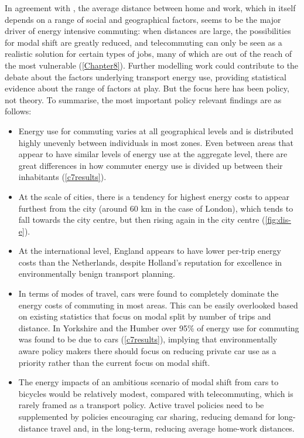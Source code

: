 In agreement with \citet{Boussauw2010}, the average distance between home and work,
which in itself depends on a range of social and geographical factors,
seems to be the major driver of energy intensive commuting: when distances
are large, the possibilities for modal shift are greatly reduced, and
telecommuting can only be seen as a realistic solution for certain types of
jobs, many of which are out of the reach of the most vulnerable
(\cref{Chapter8}).
Further modelling work could contribute to the debate about the factors
underlying transport energy use, providing statistical evidence about the range
of factors at play. But the focus here has been policy, not theory.
To summarise, the most important policy relevant findings are as follows:
\begin{itemize}
 \item Energy use for commuting varies at all geographical levels
 and is distributed highly unevenly between individuals in most zones.
 Even between areas
 that appear to have similar levels of energy use at the aggregate level, there
 are great differences in how commuter energy use is divided up between their
 inhabitants (\cref{c7results}).
 \item At the scale of cities,
 there is a tendency for highest energy costs to appear furthest from the city (around
 60 km in the case of London), which tends to fall towards the city centre, but then
 rising again in the city centre (\cref{fig:dis-e}).
 \item At the international level, England appears to have lower per-trip energy
 costs than the Netherlands, despite Holland's reputation for excellence in
 environmentally benign transport planning.
 \item In terms of modes of travel, cars were found to completely dominate the
energy costs of commuting in most areas. This can be easily overlooked based on
existing statistics that focus on modal split by number of trips and distance.
In Yorkshire and the Humber over 95\% of energy use for commuting was found to
be due to cars (\cref{c7results}), implying that environmentally aware policy
makers there should focus on reducing private car use as a priority rather than
the current focus on modal shift. 
 \item The energy impacts of an ambitious scenario of modal shift from cars to
 bicycles would be relatively modest, compared with telecommuting, which is
 rarely framed as a transport policy. Active travel policies need to be supplemented
 by policies encouraging car sharing, reducing demand for long-distance travel and,
 in the long-term, reducing average home-work distances.
\end{itemize}

